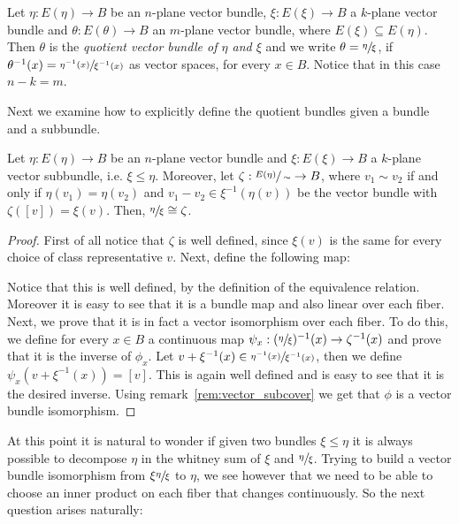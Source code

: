 \begin{definition} Let $\eta:E(\eta)\to B$ be an $n$-plane vector bundle, $\xi:E(\xi)\to B$ a $k$-plane vector bundle and $\theta:E(\theta)\to B$ an $m$-plane vector bundle, where $E(\xi)\subseteq E(\eta)$. Then $\theta$ is the \emph{quotient vector bundle of $\eta$ and $\xi$} and we write $\theta=\sfrac{\eta}{\xi}$, if $\theta^{-1}(x)=\sfrac{\eta^{-1}(x)}{\xi^{-1}(x)}$ as vector spaces, for every $x\in B$. Notice that in this case $n-k=m$.
\end{definition}
Next we examine how to explicitly define the quotient bundles given a bundle and a subbundle.
\begin{proposition}\label{prop:quotient_bundle} Let $\eta:E(\eta)\to B$ be an $n$-plane vector bundle and $\xi:E(\xi)\to B$ a $k$-plane vector subbundle, i.e. $\xi\leq\eta$. Moreover, let $\zeta:\sfrac{E(\eta)}{\sim}\to B$, where $v_1\sim v_2$ if and only if $\eta(v_1)=\eta(v_2)$ and $v_1-v_2\in\xi^{-1}(\eta(v))$ be the vector bundle with $\zeta([v])=\xi(v)$. Then, $\sfrac{\eta}{\xi}\cong\zeta$.
\end{proposition}
\begin{proof} First of all notice that $\zeta$ is well defined, since $\xi(v)$ is the same for every choice of class representative $v$. Next, define the following map:
\begin{center}
\end{center}
Notice that this is well defined, by the definition of the equivalence relation. Moreover it is easy to see that it is a bundle map and also linear over each fiber. Next, we prove that it is in fact a vector isomorphism over each fiber. To do this, we define for every $x\in B$ a continuous map $\psi_x:(\sfrac{\eta}{\xi})^{-1}(x)\to\zeta^{-1}(x)$ and prove that it is the inverse of $\phi_x$. Let $v+\xi^{-1}(x)\in\sfrac{\eta^{-1}(x)}{\xi^{-1}(x)}$, then we define $\psi_x(v+\xi^{-1}(x))=[v]$. This is again well defined and is easy to see that it is the desired inverse. Using remark~\ref{rem:vector_subcover} we get that $\phi$ is a vector bundle isomorphism.
\end{proof}

At this point it is natural to wonder if given two bundles $\xi\leq\eta$ it is always possible to decompose $\eta$ in the whitney sum of $\xi$ and $\sfrac{\eta}{\xi}$. Trying to build a vector bundle isomorphism from $\xi\sfrac{\eta}{\xi}$ to $\eta$, we see however that we need to be able to choose an inner product on each fiber that changes continuously. So the next question arises naturally:

